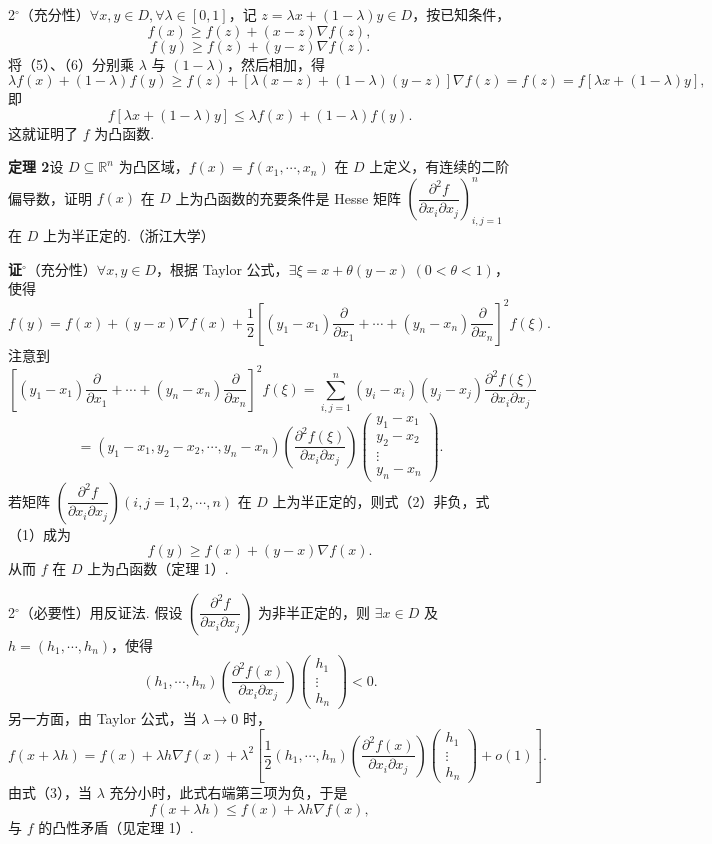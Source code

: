 \documentclass[UTF8,12pt,a4paper,fontset=fandol]{ctexart}
\begin{document}
2$^\circ$（充分性）$\forall x,y\in D,\forall\lambda\in[0,1]$，记 $z=\lambda x+(1-\lambda)y\in D$，按已知条件，
\[
  f(x)\ge f(z)+(x-z)\nabla f(z), \tag{5}
\]
\[
  f(y)\ge f(z)+(y-z)\nabla f(z). \tag{6}
\]
将（5）、（6）分别乘 $\lambda$ 与 $(1-\lambda)$，然后相加，得
\[
  \lambda f(x)+(1-\lambda)f(y)
  \ge f(z)+[\lambda(x-z)+(1-\lambda)(y-z)]\nabla f(z)
  =f(z)=f[\lambda x+(1-\lambda)y],
\]
即
\[
  f[\lambda x+(1-\lambda)y]\le\lambda f(x)+(1-\lambda)f(y).
\]
这就证明了 $f$ 为凸函数.

\noindent\textbf{定理 2}\quad 设 $D\subseteq\mathbb{R}^n$ 为凸区域，$f(x)=f(x_1,\cdots,x_n)$ 在 $D$ 上定义，有连续的二阶偏导数，证明 $f(x)$ 在 $D$ 上为凸函数的充要条件是 Hesse 矩阵 $\left(\dfrac{\partial^2 f}{\partial x_i\partial x_j}\right)_{i,j=1}^{n}$ 在 $D$ 上为半正定的.（浙江大学）

\noindent\textbf{证}$^\circ$（充分性）$\forall x,y\in D$，根据 Taylor 公式，$\exists\xi=x+\theta(y-x)\ (0<\theta<1)$，使得
\[
  f(y)=f(x)+(y-x)\nabla f(x)+\frac12
  \left[(y_1-x_1)\frac{\partial}{\partial x_1}+\cdots+
  (y_n-x_n)\frac{\partial}{\partial x_n}\right]^2 f(\xi). \tag{1}
\]
注意到
\[
  \left[(y_1-x_1)\frac{\partial}{\partial x_1}+\cdots+
  (y_n-x_n)\frac{\partial}{\partial x_n}\right]^2f(\xi)
  =\sum_{i,j=1}^{n}(y_i-x_i)(y_j-x_j)
  \frac{\partial^2f(\xi)}{\partial x_i\partial x_j}
\]
\[
  =(y_1-x_1,y_2-x_2,\cdots,y_n-x_n)
  \left(\frac{\partial^2f(\xi)}{\partial x_i\partial x_j}\right)
  \begin{pmatrix}
  y_1-x_1\\ y_2-x_2\\ \vdots\\ y_n-x_n
  \end{pmatrix}. \tag{2}
\]
若矩阵 $\left(\dfrac{\partial^2f}{\partial x_i\partial x_j}\right)(i,j=1,2,\cdots,n)$ 在 $D$ 上为半正定的，则式（2）非负，式（1）成为
\[
  f(y)\ge f(x)+(y-x)\nabla f(x).
\]
从而 $f$ 在 $D$ 上为凸函数（定理 1）.

2$^\circ$（必要性）用反证法. 假设 $\left(\dfrac{\partial^2f}{\partial x_i\partial x_j}\right)$ 为非半正定的，则 $\exists x\in D$ 及 $h=(h_1,\cdots,h_n)$，使得
\[
  (h_1,\cdots,h_n)
  \left(\frac{\partial^2f(x)}{\partial x_i\partial x_j}\right)
  \begin{pmatrix}h_1\\ \vdots\\ h_n\end{pmatrix}<0. \tag{3}
\]
另一方面，由 Taylor 公式，当 $\lambda\to0$ 时，
\[
  f(x+\lambda h)=f(x)+\lambda h\nabla f(x)
  +\lambda^2\left[
  \frac12(h_1,\cdots,h_n)
  \left(\frac{\partial^2f(x)}{\partial x_i\partial x_j}\right)
  \begin{pmatrix}h_1\\ \vdots\\ h_n\end{pmatrix}
  +o(1)\right].
\]
由式（3），当 $\lambda$ 充分小时，此式右端第三项为负，于是
\[
  f(x+\lambda h)\le f(x)+\lambda h\nabla f(x),
\]
与 $f$ 的凸性矛盾（见定理 1）.
\end{document}
